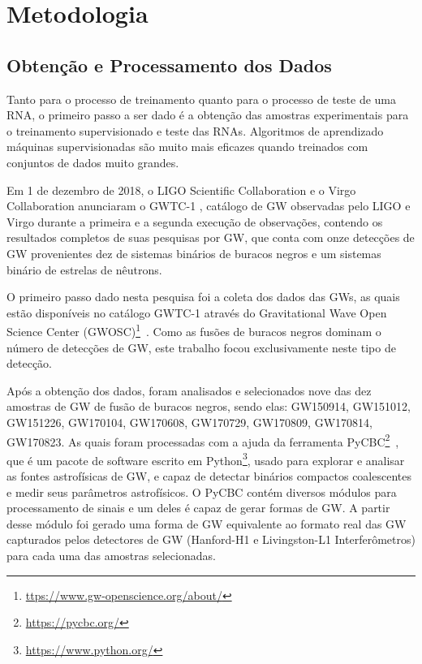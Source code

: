 \chapter{Metodologia}

\section{Obtenção e Processamento dos Dados}

Tanto para o processo de treinamento quanto para o processo de teste de uma RNA, o primeiro passo a ser dado é a obtenção das amostras experimentais para o treinamento supervisionado e teste das RNAs. Algoritmos de aprendizado máquinas supervisionadas são muito mais eficazes quando treinados com conjuntos de dados muito grandes.

Em 1 de dezembro de 2018, o LIGO Scientific Collaboration e o Virgo Collaboration anunciaram o GWTC-1 \cite{Abbott_2019}, catálogo de GW observadas pelo LIGO e Virgo durante a primeira e a segunda execução de observações, contendo os resultados completos de suas pesquisas por GW, que conta com onze detecções de GW provenientes dez de sistemas binários de buracos negros e um sistemas binário de estrelas de nêutrons.

O primeiro passo dado nesta pesquisa foi a coleta dos dados das GWs, as quais estão disponíveis no catálogo GWTC-1 através do Gravitational Wave Open Science Center (GWOSC)\footnote{\href{https://www.gw-openscience.org/about/}{ttps://www.gw-openscience.org/about/}}~\cite{vallisneri2015ligo}. Como as fusões de buracos negros dominam o número de detecções de GW, este trabalho focou exclusivamente neste tipo de detecção.

Após a obtenção dos dados, foram analisados e selecionados nove das dez amostras de GW de fusão de buracos negros, sendo elas: GW150914, GW151012, GW151226, GW170104, GW170608, GW170729, GW170809, GW170814, GW170823. As quais foram processadas com a ajuda da ferramenta PyCBC\footnote{\href{https://pycbc.org/}{https://pycbc.org/}}~\cite{alex_nitz_2019_2801307}, que é um pacote de software escrito em Python\footnote{\href{https://www.python.org/}{https://www.python.org/}}, usado para explorar e analisar as fontes astrofísicas de GW, e capaz de detectar binários compactos coalescentes e medir seus parâmetros astrofísicos. O PyCBC contém diversos módulos para processamento de sinais e um deles é capaz de gerar formas de GW. A partir desse módulo foi gerado uma forma de GW equivalente ao formato real das GW capturados pelos detectores de GW (Hanford-H1 e Livingston-L1 Interferômetros) para cada uma das amostras selecionadas.


